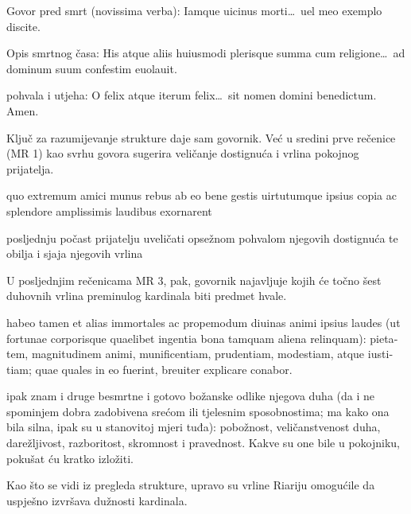 \documentclass[a5paper,twoside]{article}
\renewenvironment{quote}
               {\list{}{\rightmargin 0mm
                \leftmargin 7mm
                \itemindent 0em}%
                \item\relax}
               {\endlist}
\begin{document}
\begin{description}[nolistsep,itemsep=3pt,font=\rmfamily]
\begin{description}[nolistsep,itemsep=3pt,font=\rmfamily]
\begin{description}[nolistsep,itemsep=3pt,font=\rmfamily]
\item[2.12.3. MR 20–21] Govor pred smrt \textlatin{(novissima verba): Iamque uicinus morti\dots\ uel meo exemplo discite.}
\item[2.12.4. MR 22] Opis smrtnog časa: \textlatin{His atque aliis huiusmodi plerisque summa cum religione\dots\ ad dominum suum confestim euolauit.}
\end{description}
\end{description}
\item[3. MR 23 Završetak (peroratio)] pohvala i utjeha: \textlatin{O felix atque iterum felix\dots\ sit nomen domini benedictum. Amen.}
\end{description}

Ključ za razumijevanje strukture daje sam govornik. Već u sredini prve rečenice (MR 1) kao svrhu govora sugerira veličanje dostignuća i vrlina pokojnog prijatelja.

\begin{quote}
\begin{latin}
quo extremum amici munus rebus ab eo bene gestis uirtutumque ipsius copia ac splendore amplissimis laudibus exornarent
\end{latin}

posljednju počast prijatelju uveličati opsežnom pohvalom njegovih dostignuća te obilja i sjaja njegovih vrlina
\end{quote}

U posljednjim rečenicama MR 3, pak, govornik najavljuje kojih će točno šest duhovnih vrlina preminulog kardinala biti predmet hvale.

\begin{quote}
\begin{latin}
habeo tamen et alias immortales ac propemodum diuinas animi ipsius laudes (ut fortunae corporisque quaelibet ingentia bona tamquam aliena relinquam): pietatem, magnitudinem animi, munificentiam, prudentiam, modestiam, atque iustitiam; quae quales in eo fuerint, breuiter explicare conabor.
\end{latin}

ipak znam i druge besmrtne i gotovo božanske odlike njegova duha (da i ne spominjem dobra zadobivena srećom ili tjelesnim sposobnostima; ma kako ona bila silna, ipak su u stanovitoj mjeri tuđa): pobožnost, veličanstvenost duha, darežljivost, razboritost, skromnost i pravednost.  Kakve su one bile u pokojniku, pokušat ću kratko izložiti.
\end{quote}

Kao što se vidi iz pregleda strukture, upravo su vrline Riariju omogućile da uspješno izvršava dužnosti kardinala.
\end{document}
